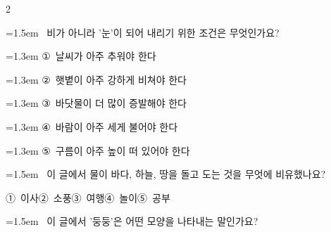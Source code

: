 \documentclass[12pt, a4paper]{article}
\begin{document}
\begin{multicols}{2}
\noindent\begin{minipage}{\columnwidth}
\vspace{2mm}
{\hangindent=1.5em  ~비가 아니라 '눈'이 되어 내리기 위한 조건은 무엇인가요?\par}

\vspace{0.5mm}
{\hangindent=1.3em  \noindent\hspace{0.3em}①~날씨가 아주 추워야 한다\par}
{\hangindent=1.3em  \noindent\hspace{0.3em}②~햇볕이 아주 강하게 비쳐야 한다\par}
{\hangindent=1.3em  \noindent\hspace{0.3em}③~바닷물이 더 많이 증발해야 한다\par}
{\hangindent=1.3em  \noindent\hspace{0.3em}④~바람이 아주 세게 불어야 한다\par}
{\hangindent=1.3em  \noindent\hspace{0.3em}⑤~구름이 아주 높이 떠 있어야 한다\par}
\vspace{4mm}
\end{minipage}
\par

\noindent\begin{minipage}{\columnwidth}
\vspace{2mm}
{\hangindent=1.5em  ~이 글에서 물이 바다, 하늘, 땅을 돌고 도는 것을 무엇에 비유했나요?\par}

\vspace{0.5mm}
\noindent
\mbox{①~이사}\hspace{1em}\mbox{②~소풍}\hspace{1em}\mbox{③~여행}\hspace{1em}\mbox{④~놀이}\hspace{1em}\mbox{⑤~공부}

\vspace{4mm}
\end{minipage}
\par

\noindent\begin{minipage}{\columnwidth}
\vspace{2mm}
{\hangindent=1.5em  ~이 글에서 '둥둥'은 어떤 모양을 나타내는 말인가요?\par}


\end{minipage}
\end{multicols}
\end{document}
